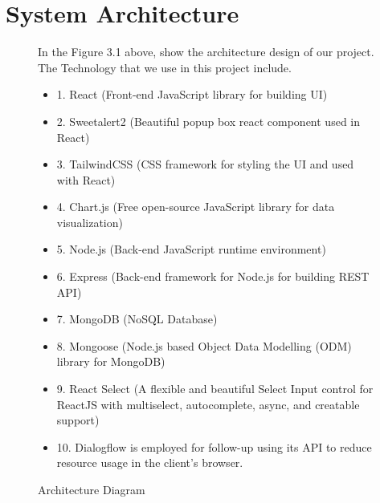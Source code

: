 \documentclass[12pt,oneside,openright,a4paper]{cpe-english-project}
\begin{document}
  \section{System Architecture}
  \begin{figure}[!h]
    \centering
    \caption{Architecture Diagram}\label{fig:System_Architecture}
    \begin{flushleft}
      \qquad In the Figure 3.1 above, show the architecture design of our project. The Technology that we use in this project include. \par
      \begin{itemize}
        \item[] 1. React (Front-end JavaScript library for building UI)
        \item[] 2. Sweetalert2 (Beautiful popup box react component used in React)
        \item[] 3. TailwindCSS (CSS framework for styling the UI and used with React)
        \item[] 4. Chart.js (Free open-source JavaScript library for data visualization)
        \item[] 5. Node.js (Back-end JavaScript runtime environment)
        \item[] 6. Express (Back-end framework for Node.js for building REST API)
        \item[] 7. MongoDB (NoSQL Database)
        \item[] 8. Mongoose (Node.js based Object Data Modelling (ODM) library for MongoDB)
        \item[] 9. React Select (A flexible and beautiful Select Input control for ReactJS with multiselect, autocomplete, async, and creatable support)
        \item[] 10. Dialogflow is employed for follow-up using its API to reduce resource usage in the client’s browser.
      \end{itemize}
    \end{flushleft}        
  \end{figure}
\end{document}
